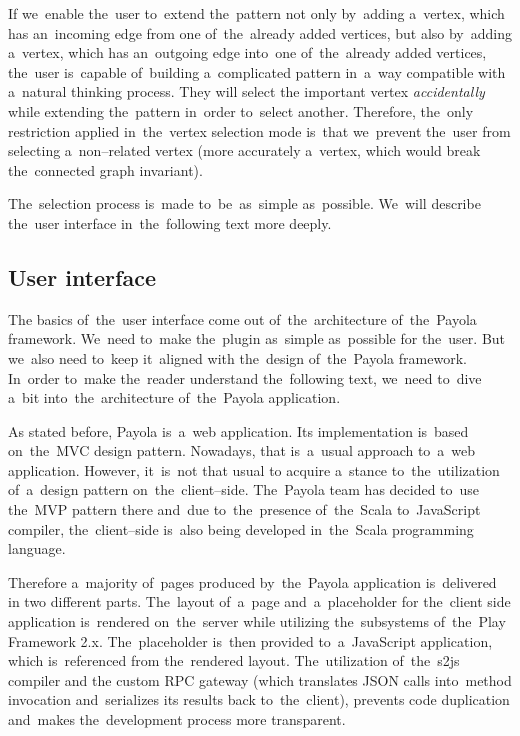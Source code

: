 If we~enable the~user to~extend the~pattern not only by~adding a~vertex, 
which has an~incoming edge from one of~the~already added vertices, but also by~adding 
a~vertex, which has an~outgoing edge into~one of~the~already added vertices, 
the~user is~capable of~building a~complicated pattern in~a~way compatible with a~natural thinking process.
They will select the
important vertex \emph{accidentally} while extending the~pattern in~order to~select another. Therefore, the~only restriction 
applied in~the~vertex selection mode is~that we~prevent the~user from selecting 
a~non--related vertex (more accurately a~vertex, which would break the~connected 
graph invariant).

The~selection process is~made to~be~as~simple as~possible. We~will describe the~user interface in~the~following text more deeply.

\subsection{User interface}
The basics of~the~user interface come out of~the~architecture of~the~Payola 
framework. We~need to~make the~plugin as~simple as~possible for the~user. But we~also need to~keep it~aligned with the~design of~the~Payola framework. In~order to~make the~reader understand the~following text, we~need to~dive a~bit into~the~architecture of~the~Payola application.

As stated before, Payola is~a~web application. Its implementation is~based on~the~MVC 
design pattern. Nowadays, that is~a~usual approach to~a~web application. However, it~is~not that usual 
to acquire a~stance to~the~utilization of~a~design pattern on~the~client--side.
The~Payola team has decided to~use the~MVP pattern there
and~due to~the~presence of~the~Scala to~JavaScript compiler,
the~client--side is~also being developed in~the~Scala programming language.

Therefore a~majority of~pages produced by~the~Payola application is~delivered 
in two different parts. The~layout of~a~page and~a~placeholder for the~client 
side application is~rendered on~the~server while utilizing the~subsystems of~the~Play Framework 2.x. The~placeholder is~then provided to~a~JavaScript application,
which is~referenced from the~rendered layout. The~utilization of~the~s2js compiler and
the custom RPC gateway (which translates JSON calls into~method invocation and~serializes its results
back to~the~client), prevents code duplication and~makes the~development process more transparent.

